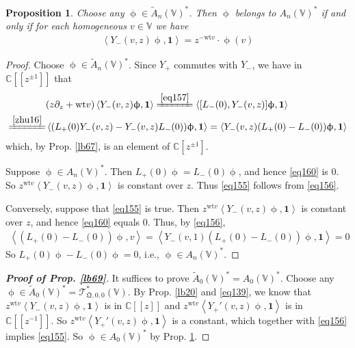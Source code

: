 \documentclass[11pt,b5paper,notitlepage]{article}
\theoremstyle{definition}
\theoremstyle{plain}
\newtheorem{pp}[df]{Proposition}
\newcommand{\wtd}{\widetilde}
\newcommand{\idt}{\mathbf{1}}
\newcommand{\scr}{\mathscr}
\newcommand{\Vbb}{\mathbb V}
\newcommand{\Cbb}{\mathbb C}
\newcommand{\wt}{\mathrm{wt}}
\newcommand{\ibf}{\mathbf 1}
\newcommand{\<}{\left\langle}
\renewcommand{\>}{\right\rangle}
\newcommand{\fq}{{\mathfrak Q}}
\numberwithin{equation}{section}
\begin{document}
\begin{pp}\label{lb70}
Choose any $\upphi\in\wtd A_n(\Vbb)^*$. Then $\upphi$ belongs to $A_n(\Vbb)^*$ if and only if for each homogeneous $v\in\Vbb$ we have
\begin{align}
\<Y_-(v,z)\upphi,\ibf\>=z^{-\wt v}\cdot \upphi(v)   \label{eq155}
\end{align}
\end{pp}

\begin{proof}
Choose $\upphi\in\wtd A_n(\Vbb)^*$. Since $Y_+$ commutes with $Y_-$, we have in $\Cbb[[z^{\pm1}]]$ that
\begin{align}
\begin{aligned}
&(z\partial_z+\wt v)\<Y_-(v,z)\upphi,\ibf\>\xlongequal{\eqref{eq157}}\<[L_-(0),Y_-(v,z)]\upphi,\idt\>  \\
\xlongequal{\eqref{zhu16}}&\<(L_+(0)Y_-(v,z)-Y_-(v,z)L_-(0))\upphi,\idt \>=\<Y_-(v,z)(L_+(0)-L_-(0))\upphi,\idt \>  \label{eq160}
\end{aligned}
\end{align}
which, by Prop. \ref{lb67}, is an element of $\Cbb[z^{\pm1}]$. 

Suppose $\upphi\in A_n(\Vbb)^*$. Then $L_+(0)\upphi=L_-(0)\upphi$, and hence \eqref{eq160} is $0$. So $z^{\wt v}\<Y_-(v,z)\upphi,\idt\>$ is constant over $z$. Thus \eqref{eq155} follows from \eqref{eq156}.

Conversely, suppose that \eqref{eq155} is true. Then $z^{\wt v}\<Y_-(v,z)\upphi,\idt\>$ is constant over $z$, and hence \eqref{eq160} equals $0$. Thus, by \eqref{eq156}, 
\begin{align*}
\<(L_+(0)-L_-(0))\upphi,v\>=\<Y_-(v,1)(L_+(0)-L_-(0))\upphi,\idt \>=0
\end{align*}
So $L_+(0)\upphi-L_-(0)\upphi=0$, i.e., $\upphi\in A_n(\Vbb)^*$.
\end{proof}



\begin{proof}[\textbf{Proof of Prop. \ref{lb69}}]
It suffices to prove $\wtd A_0(\Vbb)^*= A_0(\Vbb)^*$. Choose any $\upphi\in\wtd A_0(\Vbb)^*=\scr T_{\fq,0,0}^*(\Vbb)$. By Prop. \ref{lb20} and \eqref{eq139}, we know that $z^{\wt v}\< Y_-(v,z)\upphi,\idt\>$ is in $\Cbb[[z]]$ and $z^{\wt v}\<Y_+'(v,z)\upphi,\idt\>$ is in $\Cbb[[z^{-1}]]$. So $z^{\wt v}\<Y_+'(v,z)\upphi,\idt\>$ is a constant, which together with \eqref{eq156} implies \eqref{eq155}. So $\upphi\in A_0(\Vbb)^*$ by Prop. \ref{lb70}.
\end{proof}
\end{document}
